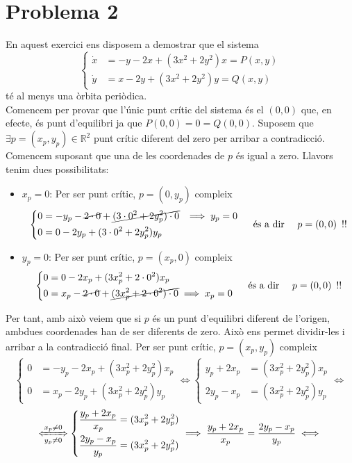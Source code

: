 \documentclass[10pt,a4paper]{article}
\begin{document}
\section*{Problema 2}
En aquest exercici ens disposem a demostrar que el sistema
\begin{equation}\label{edo}
  \left\lbrace \begin{aligned}
    \dot{x} & =-y-2x+(3x^2+2y^2)x=P(x,y) \\
    \dot{y} & =x-2y+(3x^2+2y^2)y=Q(x,y)
  \end{aligned}\right.
\end{equation}
té al menys una òrbita periòdica.
\\Comencem per provar que l'únic punt crític del sistema és el $(0,0)$ que, en efecte, és punt d'equilibri ja que $P(0,0)=0=Q(0,0)$. Suposem que $\exists p=(x_p,y_p)\in\mathbb{R}^2$ punt crític diferent del zero per arribar a contradicció. Comencem suposant que una de les coordenades de $p$ és igual a zero. Llavors tenim dues possibilitats:
\begin{itemize}
  \item \underline{$x_p=0$}: Per ser punt crític, $p=(0,y_p)$ compleix
        $$\left\lbrace \begin{aligned}
            0 & =-y_p-\cancel{2\cdot0}+\cancel{(3\cdot0^2+2y_p^2)\cdot0}\enskip\implies y_p=0 \\
            0 & =0-2y_p+(3\cdot0^2+2y_p^2)y_p
          \end{aligned}\right.\quad \text{ és a dir } \quad p=(0,0)\enskip !!$$
  \item \underline{$y_p=0$}: Per ser punt crític, $p=(x_p,0)$ compleix
        $$\left\lbrace \begin{aligned}
            0 & =0-2x_p+(3x_p^2+2\cdot0^2)x_p                                         \\
            0 & =x_p-\cancel{2\cdot0}+\cancel{(3x_p^2+2\cdot0^2)\cdot0}\implies x_p=0
          \end{aligned}\right.\quad \text{ és a dir } \quad p=(0,0)\enskip !!$$
\end{itemize}
Per tant, amb això veiem que si $p$ és un punt d'equilibri diferent de l'origen, ambdues coordenades han de ser diferents de zero. Això ens permet dividir-les i arribar a la contradicció final. Per ser punt crític, $p=(x_p,y_p)$ compleix
$$\left\lbrace \begin{aligned}
    0 & =-y_p-2x_p+(3x_p^2+2y_p^2)x_p \\
    0 & =x_p-2y_p+(3x_p^2+2y_p^2)y_p
  \end{aligned}\right.\iff
  \left\lbrace \begin{aligned}
    y_p+2x_p & =(3x_p^2+2y_p^2)x_p \\
    2y_p-x_p & =(3x_p^2+2y_p^2)y_p
  \end{aligned}\right.\iff$$$$
  \xLeftrightarrow[y_p\neq0]{x_p\neq0}
  \left\lbrace \begin{aligned}
    \frac{y_p+2x_p}{x_p} & =(3x_p^2+2y_p^2) \\
    \frac{2y_p-x_p}{y_p} & =(3x_p^2+2y_p^2)
  \end{aligned}\right. \implies\frac{y_p+2x_p}{x_p}=\frac{2y_p-x_p}{y_p}\iff$$
\end{document}
